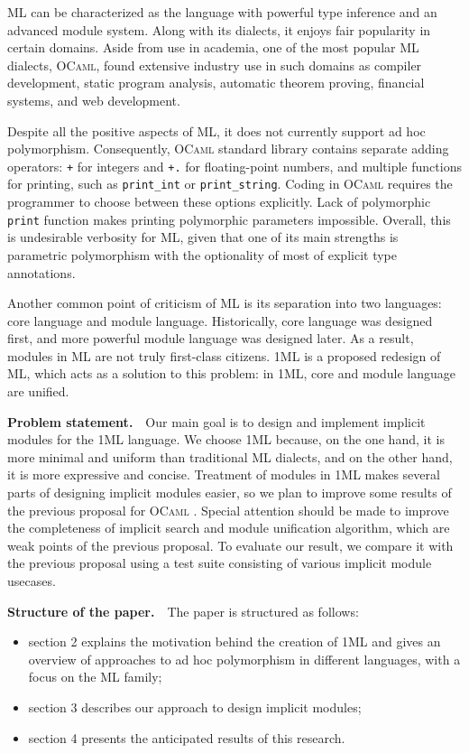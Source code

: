 \documentclass{spbau-diploma}
\begin{document}
\textsc{ML} can be characterized as the language with powerful type inference and an advanced module system. Along with its dialects, it enjoys fair popularity in certain domains. Aside from use in academia, one of the most popular \textsc{ML} dialects, \textsc{OCaml}, found extensive industry use in such domains as compiler development, static program analysis, automatic theorem proving, financial systems, and web development. 

Despite all the positive aspects of \textsc{ML}, it does not currently support ad hoc polymorphism. Consequently, \textsc{OCaml} standard library contains separate adding operators: \texttt{+} for integers and \texttt{+.} for floating-point numbers, and multiple functions for printing, such as \texttt{print\_int} or \texttt{print\_string}. Coding in \textsc{OCaml} requires the programmer to choose between these options explicitly. Lack of polymorphic \texttt{print} function makes printing polymorphic parameters impossible. Overall, this is undesirable verbosity for \textsc{ML}, given that one of its main strengths is parametric polymorphism with the optionality of most of explicit type annotations.

Another common point of criticism of \textsc{ML} is its separation into two languages: core language and module language. Historically, core language was designed first, and more powerful module language was designed later. As a result, modules in \textsc{ML} are not truly first-class citizens. \textsc{1ML} \cite{1ml} is a proposed redesign of ML, which acts as a solution to this problem: in 1ML, core and module language are unified.

\textbf{Problem statement.}~~Our main goal is to design and implement implicit modules for the \textsc{1ML} language. We choose \textsc{1ML} because, on the one hand, it is more minimal and uniform than traditional \textsc{ML} dialects, and on the other hand, it is more expressive and concise. Treatment of modules in \textsc{1ML} makes several parts of designing implicit modules easier, so we plan to improve some results of the previous proposal for \textsc{OCaml} \cite{white}. Special attention should be made to improve the completeness of implicit search and module unification algorithm, which are weak points of the previous proposal. To evaluate our result, we compare it with the previous proposal using a test suite consisting of various implicit module usecases.

\textbf{Structure of the paper.}~~The paper is structured as follows:
\begin{itemize}
\item section 2 explains the motivation behind the creation of \textsc{1ML} and gives an overview of approaches to ad hoc polymorphism in different languages, with a focus on the ML family;
\item section 3 describes our approach to design implicit modules;
\item section 4 presents the anticipated results of this research.
\end{itemize}
\end{document}
